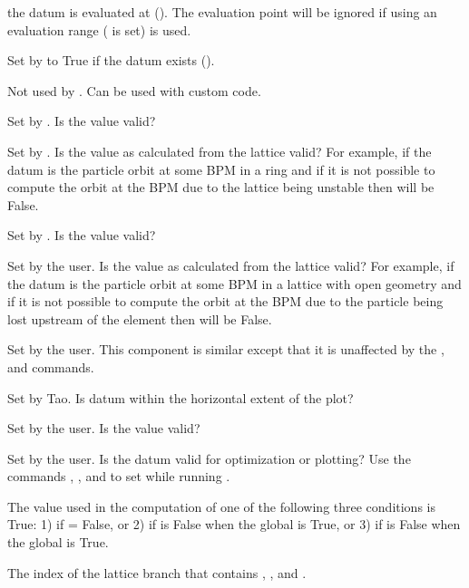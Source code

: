 \begin{description}
{the datum is evaluated at (). The evaluation point will be ignored if using an
evaluation range ( is set) is used.
%
  \item[exists] \Newline
Set by \tao to True if the datum exists (). 
%
  \item[fit] \Newline
Not used by \tao. Can be used with custom code.
%
  \item[good_base] \Newline
Set by \tao. Is the  value valid?
%
  \item[good_design] \Newline
Set by \tao. Is the value as calculated from the  lattice valid? For example, if the
datum is the particle orbit at some BPM in a ring and if it is not possible to compute the orbit at
the BPM due to the lattice being unstable then  will be False.
%
  \item[good_meas] \Newline
Set by \tao. Is the  value valid?
%
  \item[good_model] \Newline
Set by the user. Is the value as calculated from the  lattice valid? For example, if the
datum is the particle orbit at some BPM in a lattice with open geometry and if it is not possible to
compute the orbit at the BPM due to the particle being lost upstream of the element then
 will be False.
%
  \item[good_opt] \Newline
Set by the user. This component is similar  except that it is unaffected by the
,  and  commands.
%
  \item[good_plot] \Newline
Set by Tao. Is datum within the horizontal extent of the plot? 
%
  \item[good_ref] \Newline
Set by the user. Is the  value valid?
%
  \item[good_user] \Newline
Set by the user. Is the datum valid for optimization or plotting? Use the commands , ,
 and  to set while running \tao.
%
  \item[invalid] \Newline
The value used in the computation of  one of the following three conditions is
True: 1) if  = False, or 2) if  is False when the global 
is True, or 3) if  is False when the global  is True.
%
  \item[ix_branch] \Newline
The index of the lattice branch that contains , , and .
%
  \item[ix_ele] \Newline
}
\end{description}
